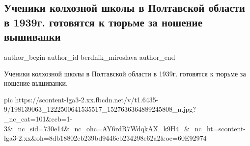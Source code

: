  
 
 
 
 
 
\subsection{Ученики колхозной школы в Полтавской области в 1939г. готовятся к тюрьме за ношение вышиванки}
\label{sec:09_06_2021.fb.berdnik_miroslava.2.vyshyvanka_deti_1939_poltava}
\ifcmt
 author_begin
   author_id berdnik_miroslava
 author_end
\fi

Ученики колхозной школы в Полтавской области в 1939г. готовятся к тюрьме за
ношение вышиванки.

\ifcmt
  pic https://scontent-lga3-2.xx.fbcdn.net/v/t1.6435-9/198139063_1222500641535517_1527636364889245808_n.jpg?_nc_cat=101&ccb=1-3&_nc_sid=730e14&_nc_ohc=AY6rdR7WdqkAX_k9H4_&_nc_ht=scontent-lga3-2.xx&oh=8db18802eb239bd9446cb234298e62a2&oe=60E92974
\fi

